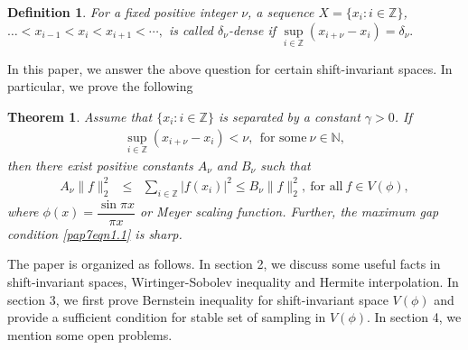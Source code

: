 \documentclass[a4paper,12pt,reqno]{amsart}
\theoremstyle{plain}
\newtheorem{thm}{Theorem}[section]
\numberwithin{equation}{section}
\newtheorem{defn}{Definition}[section]
\theoremstyle{definition}
\newcommand{\ds}{\displaystyle}
\begin{document}
\begin{defn}
For a fixed positive integer $\nu$, a sequence $X=\{x_i:{i\in\mathbb{Z}}\}$, $\dots<x_{i-1}<x_i<x_{i+1}<\cdots,$ is called $\delta_\nu$-dense if $\sup\limits_{i\in\mathbb{Z}}(x_{i+\nu}-x_i)=\delta_\nu.$
\end{defn}
In this paper, we answer the above question for certain shift-invariant spaces. In particular, we prove the following
\begin{thm}\label{pap7thm1.1}
Assume that $\{x_i:{i\in\mathbb{Z}}\}$ is separated by a constant $\gamma>0$. If
\begin{eqnarray}\label{pap7eqn1.1}
 \sup\limits_{i\in\mathbb{Z}}(x_{i+\nu}-x_i)<\nu,~~\text{for some}~\nu\in\mathbb{N},  
\end{eqnarray}
then there exist positive constants $A_\nu$ and $B_\nu$ such that
\begin{eqnarray*}\label{pap3eqn2.7}
A_\nu\| f\|_2^2&\leq&\ds\sum\limits_{i\in\mathbb{Z}}|f(x_i)|^2\leq B_\nu\| f\|_2^2, ~\text{for all}~ f\in V(\phi),
\end{eqnarray*}
where $\phi(x)=\dfrac{\sin \pi x}{\pi x}$ or Meyer scaling function. Further, the maximum gap condition \eqref{pap7eqn1.1} is sharp.
\end{thm}
The paper is organized as follows. In section 2, we discuss some useful facts in shift-invariant spaces, Wirtinger-Sobolev inequality and Hermite interpolation. In section 3, we first prove Bernstein inequality for
shift-invariant space $V(\phi)$ and provide a sufficient condition for stable set of sampling in $V(\phi)$. In section 4, we mention some open problems.
\end{document}
